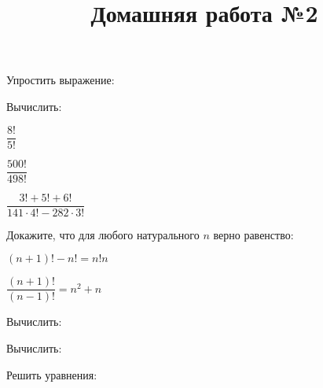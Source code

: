 \begin{listofex}
	\item Упростить выражение:
	\begin{enumcols}[itemcolumns=2]
		\item {}
		\item {}
	\end{enumcols}
	\item Вычислить:
	\begin{enumcols}[itemcolumns=3]
		\item \( \dfrac{8!}{5!} \)
		\item \( \dfrac{500!}{498!} \)
		\item \( \dfrac{3!+5!+6!}{141\cdot4!-282\cdot3!} \)
	\end{enumcols}
	\item Докажите, что для любого натурального \( n \) верно равенство:
	\begin{enumcols}[itemcolumns=2]
		\item \( (n+1)!-n! = n!n \)
		\item \( \dfrac{(n+1)!}{(n-1)!}=n^2+n \)
	\end{enumcols}
	\item {}
	\item Вычислить:
	\begin{enumcols}[itemcolumns=2]
		\item {}
		\item {}
		\item {}
	\end{enumcols}
	\item Вычислить:
	\begin{enumcols}[itemcolumns=2]
		\item {}
		\item {}
	\end{enumcols}
	\item Решить уравнения:
	\begin{enumcols}[itemcolumns=2]
		\item {}
		\item {}
	\end{enumcols}
\end{listofex}
\newpage
\title{Домашняя работа №2}

